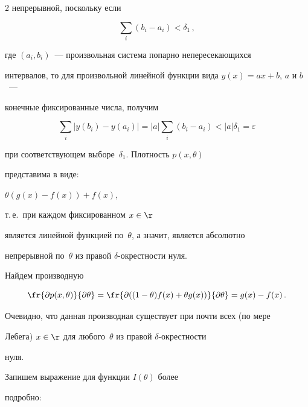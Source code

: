 \begin{multicols}{2}
непрерывной, поскольку если

\begin{equation*}

\sum\limits_i(b_i-a_i)<\delta_1\,,

\end{equation*}

где $(a_i,b_i)$~--- произвольная система попарно непересекающихся

интервалов, то для произвольной линейной функции вида $y(x)=ax+b$, $a$ и $b$~--- 

конечные фиксированные числа, получим

\begin{equation*}

\sum\limits_i|y(b_i)-y(a_i)|=|a|\sum\limits_i(b_i-a_i)<|a|\delta_1=\varepsilon

\end{equation*}

при соответствующем выборе~$\delta_1$. Плотность $p(x,\theta)$

представима в виде:

$

\theta (g(x)-f(x))+f(x)$,

т.\,е.\ при каждом фиксированном $x\in\r$

является линейной функцией по~$\theta$, а значит, является абсолютно

непрерывной по~$\theta$ из правой $\delta$-окрест\-ности нуля.



 Найдем производную

\begin{equation*}

\fr{\partial p(x,\theta)}{\partial\theta}=\fr{\partial

((1-\theta) f(x)+\theta g(x))}{\partial\theta}=g(x)-f(x)\,.

\end{equation*}

Очевидно, что данная производная существует при почти всех (по мере

Лебега) $x\in\r$ для любого~$\theta$ из правой $\delta$-окрест\-ности

нуля.



 Запишем выражение для функции $I(\theta)$ более

подробно:

\begin{multline*}


\end{multline*}
\end{multicols}

